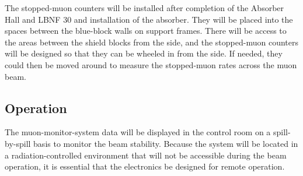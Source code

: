 The stopped-muon counters will be installed after completion of the 
Absorber Hall and LBNF 30  
and installation of the absorber. 
They will be placed into the spaces between the blue-block walls on
support frames.   There will be access to the areas between the shield blocks 
from the side, and the stopped-muon counters will be designed so that they can 
be wheeled in from the side.  If needed, they could then be moved around to measure
the stopped-muon rates across the muon beam.

\subsection{Operation}

The muon-monitor-system data will be displayed in the control room on
a spill-by-spill basis to monitor the beam stability. Because the
system will be located in a radiation-controlled environment that will
not be accessible during the beam operation, it is essential that the
electronics be designed for remote operation.

